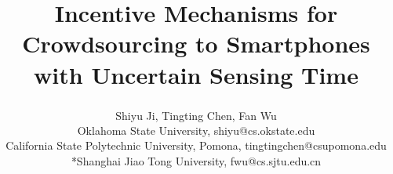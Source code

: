 \documentclass{IEEEtran}
\begin{document}
\title{Incentive Mechanisms for Crowdsourcing to Smartphones with Uncertain Sensing Time}
\author{
Shiyu Ji\textsuperscript\textdagger, Tingting Chen\textsuperscript\textsection, Fan Wu\textsuperscript *\\
\textdagger\hspace{0.1cm}Oklahoma State University, shiyu@cs.okstate.edu\\
\textsection\hspace{0.1cm}California State Polytechnic University, Pomona, tingtingchen@csupomona.edu\\
*\hspace{0.1cm}Shanghai Jiao Tong University, fwu@cs.sjtu.edu.cn}
\maketitle

\newtheorem{definition}{Definition}
\theoremstyle{definition}
\newtheorem{theorem}{Theorem}
\theoremstyle{plain}
\newtheorem{lemma}{Lemma}
\theoremstyle{plain}
\newtheorem{corollary}{Corollary}
\theoremstyle{plain}
\end{document}
